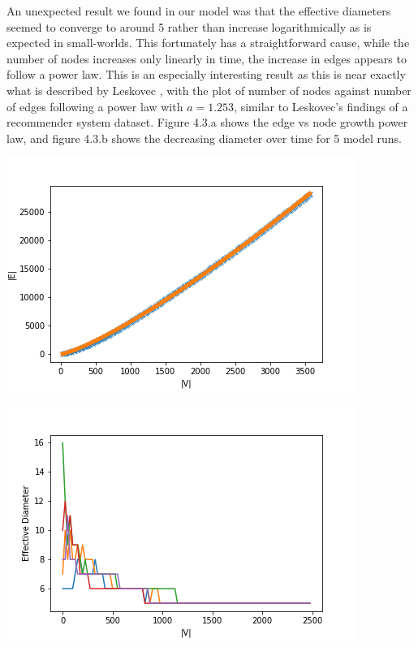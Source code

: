 \documentclass[12pt,twoside]{report}
\begin{document}
An unexpected result we found in our model was that the effective diameters seemed to converge to around 5 rather than increase logarithmically as is expected in small-worlds. This fortunately has a straightforward cause, while the number of nodes increases only linearly in time, the increase in edges appears to follow a power law. This is an especially interesting result as this is near exactly what is described by Leskovec \cite{leskovec2007graph}, with the plot of number of nodes against number of edges following a power law with $a = 1.253$, similar to Leskovec's findings of a recommender system dataset. Figure 4.3.a shows the edge vs node growth power law, and figure 4.3.b shows the decreasing diameter over time for 5 model runs.  \\


\begin{center}
\begin{minipage}{0.45\linewidth}
\includegraphics[width=\linewidth]{figures/densification.png}
\end{minipage}%
\hfill
\begin{minipage}{0.45\linewidth}
\includegraphics[width=\linewidth]{figures/diameters.png}
\end{minipage}
\end{center}
\end{document}
